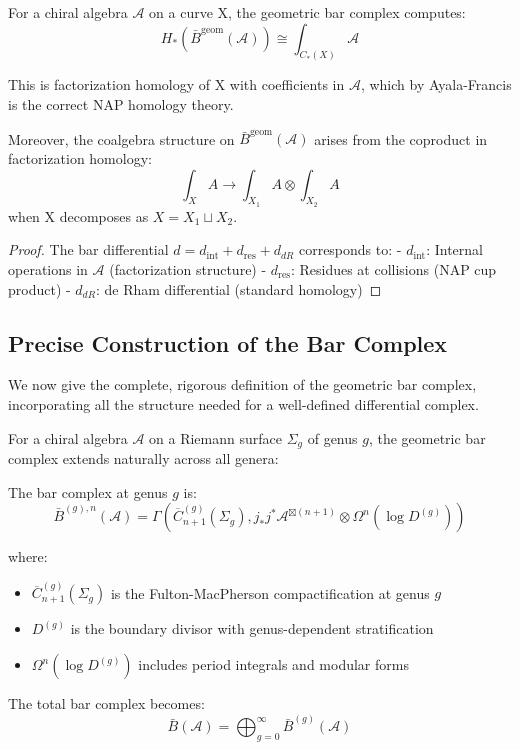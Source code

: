 \begin{theorem}\label{thm:bar-NAP-homology}
For a chiral algebra $\mathcal{A}$ on a curve X, the geometric bar complex computes:
$$H_*(\bar{B}^{\text{geom}}(\mathcal{A})) \cong \int_{C_*(X)} \mathcal{A}$$

This is factorization homology of X with coefficients in $\mathcal{A}$, which by Ayala-Francis is the correct NAP homology theory.

Moreover, the coalgebra structure on $\bar{B}^{\text{geom}}(\mathcal{A})$ arises from the coproduct in factorization homology:
$$\int_X A \to \int_{X_1} A \otimes \int_{X_2} A$$
when X decomposes as $X = X_1 \sqcup X_2$.
\end{theorem}

\begin{proof}
The bar differential $d = d_{\text{int}} + d_{\text{res}} + d_{dR}$ corresponds to:
- $d_{\text{int}}$: Internal operations in $\mathcal{A}$ (factorization structure)
- $d_{\text{res}}$: Residues at collisions (NAP cup product)
- $d_{dR}$: de Rham differential (standard homology)
\end{proof}

\subsection{Precise Construction of the Bar Complex}

We now give the complete, rigorous definition of the geometric bar complex, incorporating all the structure needed for a well-defined differential complex.

For a chiral algebra $\mathcal{A}$ on a Riemann surface $\Sigma_g$ of genus $g$, the geometric bar complex extends naturally across all genera:

\begin{definition}
The bar complex at genus $g$ is:
$$\bar{B}^{(g),n}(\mathcal{A}) = \Gamma\left(\overline{C}_{n+1}^{(g)}(\Sigma_g), j_*j^*\mathcal{A}^{\boxtimes(n+1)} \otimes \Omega^n(\log D^{(g)})\right)$$

where:
\begin{itemize}
\item $\overline{C}_{n+1}^{(g)}(\Sigma_g)$ is the Fulton-MacPherson compactification at genus $g$
\item $D^{(g)}$ is the boundary divisor with genus-dependent stratification
\item $\Omega^n(\log D^{(g)})$ includes period integrals and modular forms
\end{itemize}

The total bar complex becomes:
$$\bar{B}(\mathcal{A}) = \bigoplus_{g=0}^{\infty} \bar{B}^{(g)}(\mathcal{A})$$
\end{definition}

